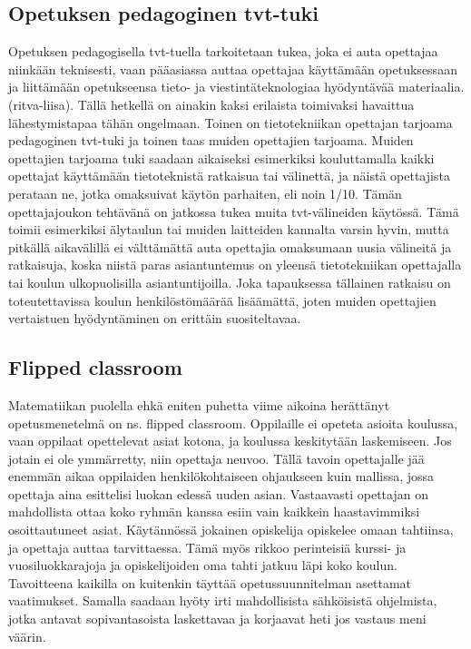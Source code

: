\documentclass[utf8,bachelor]{gradu3}
\begin{document}
\subsection{Opetuksen pedagoginen tvt-tuki}
Opetuksen pedagogisella tvt-tuella tarkoitetaan tukea, joka ei auta opettajaa niinkään teknisesti, vaan pääasiassa auttaa opettajaa käyttämään opetuksessaan ja liittämään opetukseensa tieto- ja viestintäteknologiaa hyödyntävää materiaalia. (ritva-liisa). Tällä hetkellä on ainakin kaksi erilaista toimivaksi havaittua lähestymistapaa tähän ongelmaan. Toinen on tietotekniikan opettajan tarjoama pedagoginen tvt-tuki ja toinen taas muiden opettajien tarjoama. Muiden opettajien tarjoama tuki saadaan aikaiseksi esimerkiksi kouluttamalla kaikki opettajat käyttämään tietoteknistä ratkaisua tai välinettä, ja näistä opettajista perataan ne, jotka omaksuivat käytön parhaiten, eli noin 1/10. Tämän opettajajoukon tehtävänä on jatkossa tukea muita tvt-välineiden käytössä. Tämä toimii esimerkiksi älytaulun tai muiden laitteiden kannalta varsin hyvin, mutta pitkällä aikavälillä ei välttämättä auta opettajia omaksumaan uusia välineitä ja ratkaisuja, koska niistä paras asiantuntemus on yleensä tietotekniikan opettajalla tai koulun ulkopuolisilla asiantuntijoilla. Joka tapauksessa tällainen ratkaisu on toteutettavissa koulun henkilöstömäärää lisäämättä, joten muiden opettajien vertaistuen hyödyntäminen on erittäin suositeltavaa.

\subsection{Flipped classroom}
Matematiikan puolella \parencite[][]{maot} ehkä eniten puhetta viime aikoina herättänyt opetusmenetelmä on ns. flipped classroom.\parencite[][]{flipped} Oppilaille ei opeteta asioita koulussa, vaan oppilaat opettelevat asiat kotona, ja koulussa keskitytään laskemiseen. Jos jotain ei ole ymmärretty, niin opettaja neuvoo. Tällä tavoin opettajalle jää enemmän aikaa oppilaiden henkilökohtaiseen ohjaukseen kuin mallissa, jossa opettaja aina esittelisi luokan edessä uuden asian. Vastaavasti opettajan on mahdollista ottaa koko ryhmän kanssa esiin vain kaikkein haastavimmiksi osoittautuneet asiat. Käytännössä jokainen opiskelija opiskelee omaan tahtiinsa, ja opettaja auttaa tarvittaessa. Tämä myös rikkoo perinteisiä kurssi- ja vuosiluokkarajoja ja opiskelijoiden oma tahti jatkuu läpi koko koulun. Tavoitteena kaikilla on kuitenkin täyttää opetussuunnitelman asettamat vaatimukset. Samalla saadaan hyöty irti mahdollisista sähköisistä ohjelmista, jotka antavat sopivantasoista laskettavaa ja korjaavat heti jos vastaus meni väärin.
\end{document}

